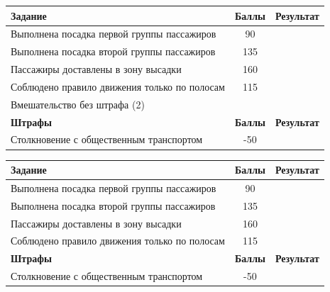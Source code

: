 \documentclass[12pt]{article}
\newcommand{\penaltyBusPoints}{\color{red}-50}
\newcommand{\boardingPassangersFirstZone}{90}
\newcommand{\boardingPassangersSecondZone}{135}
\newcommand{\passangersDelievery}{160}
\newcommand{\complianceTrafficRules}{115}
\begin{document}
\vspace*{0.25cm}
\begin{tabularx}{\textwidth}{|X|c|p{2cm}|}
    \hline
    \textbf{Задание} & \textbf{Баллы} & \textbf{Результат}\\
    \hline
    Выполнена посадка первой группы пассажиров & \boardingPassangersFirstZone &  \\
    \hline
    Выполнена посадка второй группы пассажиров & \boardingPassangersSecondZone & \\
    \hline
    Пассажиры доставлены в зону высадки & \passangersDelievery & \\
    \hline 
    Соблюдено правило движения только по полосам & \complianceTrafficRules & \\
    \hline
    Вмешательство без штрафа (2) &  \\
    \hline
    \textbf{Штрафы} & \textbf{Баллы} & \textbf{Результат} \\
    \hline
    Столкновение с общественным транспортом & \penaltyBusPoints &  \\
    \hline
\end{tabularx}
\vspace*{0.5cm}

\vspace*{0.25cm}
\begin{tabularx}{\textwidth}{|X|c|p{2cm}|}
    \hline
    \textbf{Задание} & \textbf{Баллы} & \textbf{Результат}\\
    \hline
    Выполнена посадка первой группы пассажиров & \boardingPassangersFirstZone &  \\
    \hline
    Выполнена посадка второй группы пассажиров & \boardingPassangersSecondZone & \\
    \hline
    Пассажиры доставлены в зону высадки & \passangersDelievery & \\
    \hline 
    Соблюдено правило движения только по полосам & \complianceTrafficRules & \\
    \hline
    \textbf{Штрафы} & \textbf{Баллы} & \textbf{Результат} \\
    \hline
    Столкновение с общественным транспортом & \penaltyBusPoints &  \\
    \hline
\end{tabularx}
\vspace*{1cm}

\end{document}
